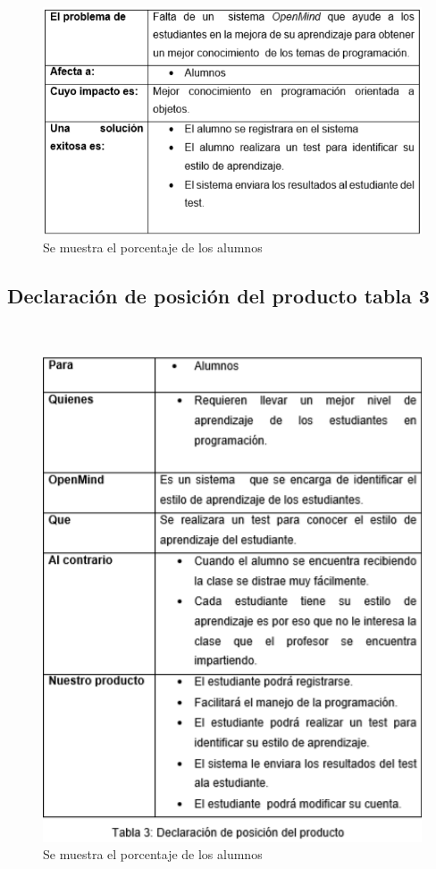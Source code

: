 \documentclass[letterpaper,oneside,openany,11pt]{book}
\begin{document}
\begin{figure}[H]
	\centering
	\includegraphics[width=1.0\textwidth]{./Imagenes/9}
	\caption{Se muestra el porcentaje de los alumnos}
\end{figure}

\subsection{Declaración de posición del producto tabla 3}
\noindent \\

\begin{figure}[H]
	\centering
	\includegraphics[width=1.0\textwidth]{./Imagenes/10}
	\caption{Se muestra el porcentaje de los alumnos}
\end{figure}
\end{document}
